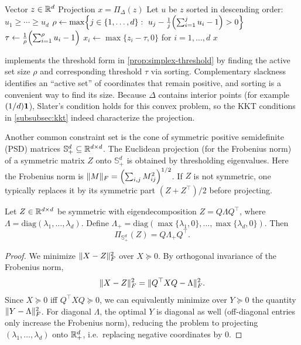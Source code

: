 \begin{algorithm}
  \caption{Projection onto the simplex $\Delta$ (sorting + threshold)}
  \label{alg:simplex-proj}
  \begin{algorithmic}[1]
    \Require Vector $z\in\mathbb{R}^d$
    \Ensure Projection $x=\Pi_\Delta(z)$
    \State Let $u$ be $z$ sorted in descending order: $u_1\ge \cdots \ge u_d$
    \State $\rho \gets \max\Bigl\{j\in\{1,\dots,d\}:\ u_j - \frac{1}{j}\Bigl(\sum_{i=1}^j u_i - 1\Bigr) > 0\Bigr\}$
    \State $\tau \gets \frac{1}{\rho}\Bigl(\sum_{i=1}^{\rho} u_i - 1\Bigr)$
    \State $x_i \gets \max\{z_i-\tau,0\}$ for $i=1,\dots,d$
    \State \Return $x$
  \end{algorithmic}
\end{algorithm}

 implements the threshold form in \cref{prop:simplex-threshold} by finding the active set size $\rho$ and corresponding threshold $\tau$ via sorting.
Complementary slackness identifies an ``active set'' of coordinates that remain positive, and sorting is a convenient way to find its size.
Because $\Delta$ contains interior points (for example $(1/d)\mathbf{1}$), Slater's condition holds for this convex problem, so the KKT conditions in \cref{subsubsec:kkt} indeed characterize the projection.

Another common constraint set is the cone of symmetric positive semidefinite (PSD) matrices $\mathbb{S}^d_+ \subseteq \mathbb{R}^{d\times d}$.
The Euclidean projection (for the Frobenius norm) of a symmetric matrix $Z$ onto $\mathbb{S}^d_+$ is obtained by thresholding eigenvalues.
Here the Frobenius norm is $\lVert M\rVert_F = \left(\sum_{i,j} M_{ij}^2\right)^{1/2}$.
If $Z$ is not symmetric, one typically replaces it by its symmetric part $(Z+Z^\top)/2$ before projecting.

\begin{proposition}
\label{prop:psd-proj}
Let $Z\in\mathbb{R}^{d\times d}$ be symmetric with eigendecomposition $Z=Q\Lambda Q^\top$, where $\Lambda=\mathrm{diag}(\lambda_1,\dots,\lambda_d)$.
Define $\Lambda_+=\mathrm{diag}(\max\{\lambda_1,0\},\dots,\max\{\lambda_d,0\})$.
Then
\[
  \Pi_{\mathbb{S}^d_+}(Z) = Q\Lambda_+ Q^\top.
\]
\end{proposition}
\begin{proof}
We minimize $\lVert X-Z\rVert_F^2$ over $X\succeq 0$.
By orthogonal invariance of the Frobenius norm,
\[
  \lVert X-Z\rVert_F^2 = \lVert Q^\top X Q - \Lambda\rVert_F^2.
\]
Since $X\succeq 0$ iff $Q^\top X Q \succeq 0$, we can equivalently minimize over $Y\succeq 0$ the quantity $\lVert Y-\Lambda\rVert_F^2$.
For diagonal $\Lambda$, the optimal $Y$ is diagonal as well (off-diagonal entries only increase the Frobenius norm), reducing the problem to projecting $(\lambda_1,\dots,\lambda_d)$ onto $\mathbb{R}_+^d$, i.e.\ replacing negative coordinates by $0$.
\end{proof}

